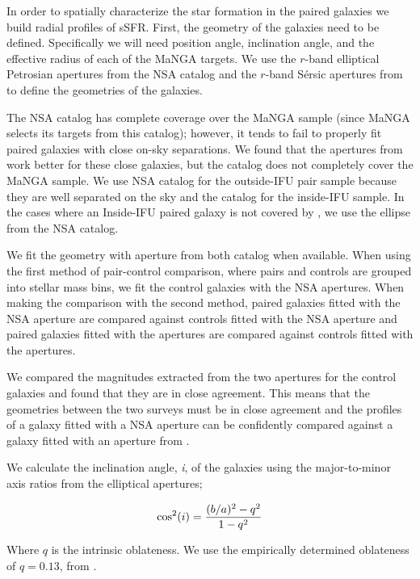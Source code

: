 \documentclass[iop,revtex4,twocolumn,apj,numberedappendix,appendixfloats]{emulateapj}
\begin{document}
In order to spatially characterize the star formation in the paired galaxies we build radial profiles of sSFR. First, the geometry of the galaxies need to be defined. Specifically we will need position angle, inclination angle, and the effective radius of each of the MaNGA targets. We use the $r$-band elliptical Petrosian apertures from the NSA catalog and the $r$-band S\'ersic apertures from \citet{Simard:2011} to define the geometries of the galaxies. 

The NSA catalog has complete coverage over the MaNGA sample (since MaNGA selects its targets from this catalog); however, it tends to fail to properly fit paired galaxies with close on-sky separations. We found that the apertures from \citet{Simard:2011} work better for these close galaxies, but the catalog does not completely cover the MaNGA sample. We use NSA catalog for the outside-IFU pair sample because they are well separated on the sky and the \citet{Simard:2011} catalog for the inside-IFU sample. In the cases where an Inside-IFU paired galaxy is not covered by \citet{Simard:2011}, we use the ellipse from the NSA catalog. 

We fit the geometry with aperture from both catalog when available. When using the first method of pair-control comparison, where pairs and controls are grouped into stellar mass bins, we fit the control galaxies with the NSA apertures. When making the comparison with the second method, paired galaxies fitted with the NSA aperture are compared against controls fitted with the NSA aperture and paired galaxies fitted with the \citet{Simard:2011} apertures are compared against controls fitted with the \citet{Simard:2011} apertures. 

We compared the magnitudes extracted from the two apertures for the control galaxies and found that they are in close agreement. This means that the geometries between the two surveys must be in close agreement and the profiles of a galaxy fitted with a NSA aperture can be confidently compared against a galaxy fitted with an aperture from \citet{Simard:2011}. 

We calculate the inclination angle, {\it i}, of the galaxies using the major-to-minor axis ratios from the elliptical apertures;

\begin{equation}
{\rm cos^2}(i) = \frac{(b/a)^2 - q^2}{1 - q^2}
\end{equation}

Where $q$ is the intrinsic oblateness. We use the empirically determined oblateness of $q = 0.13$, from \citet{Giovanelli:1994}.
\end{document}
